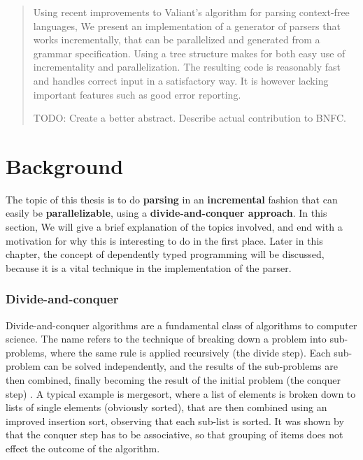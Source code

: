 \documentclass[a4paper,12pt,twosided]{report}
\renewcommand\cite{\citep}
\begin{document}


\begin{abstract}
Using recent improvements to Valiant's algorithm for parsing context-free
languages, We present an implementation of a generator of parsers that works
incrementally, that can be parallelized and generated from a grammar
specification. Using a tree structure makes for both easy use of incrementality
and parallelization.  The resulting code is reasonably fast and handles correct
input in a satisfactory way. It is however lacking important features such as
good error reporting.

TODO: Create a better abstract. Describe actual contribution to BNFC.
\end{abstract}

\tableofcontents

%
%

\chapter{Background}

The topic of this thesis is to do \textbf{parsing} in an \textbf{incremental}
fashion that can easily be \textbf{parallelizable}, using a
\textbf{divide-and-conquer approach}. In this section, We will give a brief
explanation of the topics involved, and end with a motivation for why this is
interesting to do in the first place. Later in this chapter, the concept of
dependently typed programming will be discussed, because it is a vital technique
in the implementation of the parser.

\subsection{Divide-and-conquer}
Divide-and-conquer algorithms are a fundamental class of algorithms to computer
science. The name refers to the technique of breaking down a problem into
sub-problems, where the same rule is applied recursively (the divide step). Each
sub-problem can be solved independently, and the results of the sub-problems are
then combined, finally becoming the result of the initial problem (the conquer
step) \cite[p.209]{algorithmdesign}. A typical example is mergesort, where a
list of elements is broken down to lists of single elements (obviously sorted),
that are then combined using an improved insertion sort, observing that each
sub-list is sorted. It was shown by \citet{birdlists} that the conquer step has
to be associative, so that grouping of items does not effect the outcome of the
algorithm. 
\end{document}
